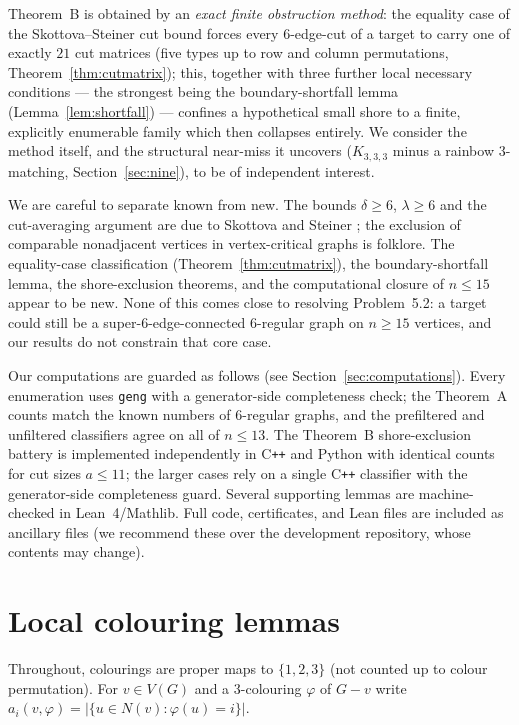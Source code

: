 \documentclass[11pt]{article}
\theoremstyle{remark}
\begin{document}
Theorem~B is obtained by an \emph{exact finite obstruction method}: the equality
case of the Skottova--Steiner cut bound forces every $6$-edge-cut of a target to
carry one of exactly $21$ cut matrices (five types up to row and column
permutations, Theorem~\ref{thm:cutmatrix}); this, together with three further local
necessary conditions --- the strongest being the boundary-shortfall lemma
(Lemma~\ref{lem:shortfall}) --- confines a hypothetical small shore to a finite,
explicitly enumerable family which then collapses entirely. We consider the method
itself, and the structural near-miss it uncovers ($K_{3,3,3}$ minus a rainbow
$3$-matching, Section~\ref{sec:nine}), to be of independent interest.

We are careful to separate known from new. The bounds $\delta\ge 6$, $\lambda\ge 6$
and the cut-averaging argument are due to Skottova and Steiner \cite{SkSt25};
the exclusion of comparable nonadjacent vertices in vertex-critical graphs is
folklore. The equality-case classification (Theorem~\ref{thm:cutmatrix}), the
boundary-shortfall lemma, the shore-exclusion theorems, and the computational
closure of $n\le 15$ appear to be new. None of this comes close to resolving
Problem~5.2: a target could still be a super-$6$-edge-connected $6$-regular graph
on $n\ge 15$ vertices, and our results do not constrain that core case.

Our computations are guarded as follows (see Section~\ref{sec:computations}). Every
enumeration uses \texttt{geng} with a generator-side completeness check; the
Theorem~A counts match the known numbers of $6$-regular graphs, and the prefiltered
and unfiltered classifiers agree on all of $n\le 13$. The Theorem~B shore-exclusion
battery is implemented independently in C\texttt{++} and Python with identical
counts for cut sizes $a\le 11$; the larger cases rely on a single C\texttt{++}
classifier with the generator-side completeness guard. Several supporting lemmas are
machine-checked in Lean~4/Mathlib. Full code, certificates, and Lean files are
included as ancillary files (we recommend these over the development repository,
whose contents may change).

\section{Local colouring lemmas}\label{sec:local}

Throughout, colourings are proper maps to $\{1,2,3\}$ (not counted up to colour
permutation). For $v\in V(G)$ and a $3$-colouring $\varphi$ of $G-v$ write
$a_i(v,\varphi)=|\{u\in N(v):\varphi(u)=i\}|$.
\end{document}
